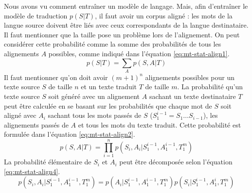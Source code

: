 \documentclass{KodeBook}
\begin{document}
Nous avons vu comment entraîner un modèle de langage. 
Mais, afin d'entraîner le modèle de traduction $p(S|T)$, il faut avoir un corpus aligné : les mots de la langue source doivent être liés avec ceux correspondants de la langue destinataire.
Il faut mentionner que la taille pose un problème lors de l'alignement. 
On peut considérer cette probabilité comme la somme des probabilités de tous les alignements $A$ possibles, comme indiqué dans l'équation \ref{eq:mt-stat-align1}.
\begin{equation}\label{eq:mt-stat-align1}
p(S|T) = \sum_{A} p(S, A | T)
\end{equation}
Il faut mentionner qu'on doit avoir $(m + 1)^n$ alignements possibles pour un texte source $S$ de taille $n$ et un texte traduit $T$ de taille $m$.
La probabilité qu'un texte source $S$ soit généré avec un alignement $A$ sachant un texte destinataire $T$ peut être calculée en se basant sur les probabilités que chaque mot de $S$ soit aligné avec $A_i$ sachant tous les mots passés de $S$ ($S_1^{i-1} = S_1 \ldots S_{i-1}$), les alignements passés de $A$ et tous les mots du texte traduit. 
Cette probabilité est formulée dans l'équation \ref{eq:mt-stat-align2}.
\begin{equation}\label{eq:mt-stat-align2}
p(S, A | T) = \prod_{i=1}^{n} p(S_i, A_i | S_1^{i-1}, A_1^{i-1}, T_1^{m})
\end{equation}
La probabilité élémentaire de $S_i$ et $A_i$ peut être décomposée selon l'équation \ref{eq:mt-stat-align4}.
\begin{equation}\label{eq:mt-stat-align4}
p(S_i, A_i | S_1^{i-1}, A_1^{i-1}, T_1^{m}) = p(A_i | S_1^{i-1}, A_1^{i-1}, T_1^{m}) p(S_i | S_1^{i-1}, A_1^{i}, T_1^{m})
\end{equation}
\end{document}
